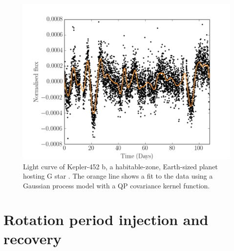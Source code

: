 \begin{figure}
\begin{center}
\includegraphics[width=6in, clip=true]{figures/Kepler452b.pdf}
\caption[A light curve with a GP model.]
{Light curve of Kepler-452 b, a habitable-zone, Earth-sized planet
hosting G star \citep{Jenkins2015}. The orange line shows a fit to the data using
a Gaussian process model with a QP covariance kernel function.}
\label{fig:GP_example}
\end{center}
\end{figure}

\section{Rotation period injection and recovery}

